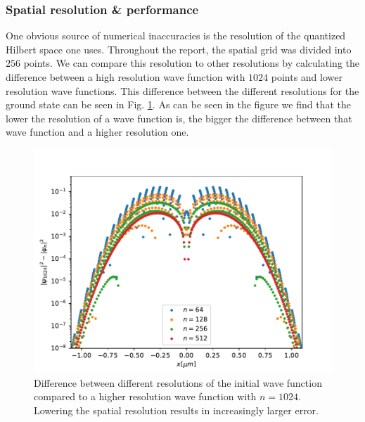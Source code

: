 \documentclass[a4paper, twocolumn]{revtex4-1}
\begin{document}
\subsubsection{Spatial resolution \& performance}
One obvious source of numerical inaccuracies is the resolution of the quantized Hilbert space one uses. Throughout the report, the spatial grid was divided into $256$ points. We can compare this resolution to other resolutions by calculating the difference between a high resolution wave function with $1024$ points and lower resolution wave functions. This difference between the different resolutions for the ground state can be seen in Fig. \ref{fig:groundstateGrid}. As can be seen in the figure we find that the lower the resolution of a wave function is, the bigger the difference between that wave function and a higher resolution one. \\
\begin{figure}
	\includegraphics[width=\columnwidth]{graphics/stateAnalysis/GroundstateGrid.pdf}
	\caption{Difference between different resolutions of the initial wave function compared to a higher resolution wave function with $n = 1024$. Lowering the spatial resolution results in increasingly larger error.}
	\label{fig:groundstateGrid}
\end{figure}
\end{document}
